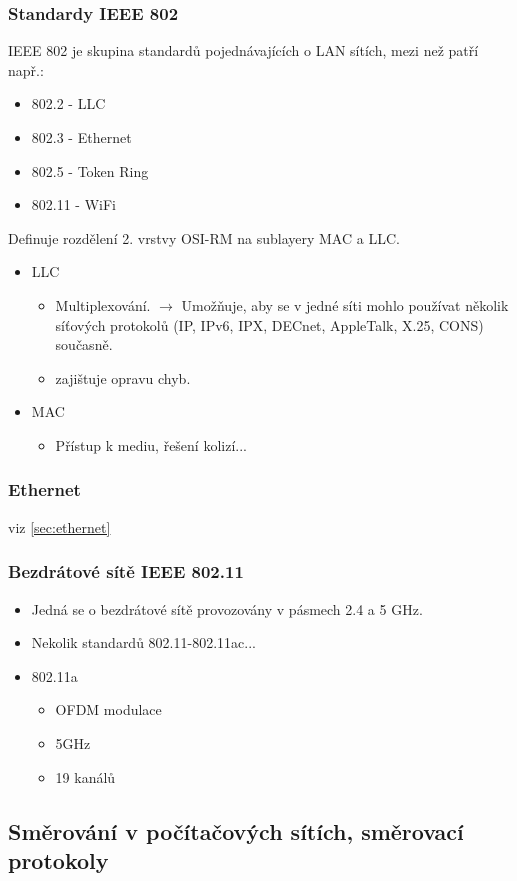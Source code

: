 \documentclass[10pt,a4paper]{article}
\begin{document}
\subsubsection{Standardy IEEE 802}
IEEE 802 je skupina standardů pojednávajících o LAN sítích, mezi než patří např.:
\begin{itemize}
\item 802.2 - LLC
\item 802.3 - Ethernet
\item 802.5 - Token Ring
\item 802.11 - WiFi
\end{itemize}
Definuje rozdělení 2. vrstvy OSI-RM na sublayery MAC a LLC.
\begin{itemize}
\item LLC
\begin{itemize}
\item Multiplexování. $\rightarrow$ Umožňuje, aby se v jedné síti mohlo používat několik síťových protokolů (IP, IPv6, IPX, DECnet, AppleTalk, X.25, CONS) současně.
\item zajištuje opravu chyb.
\end{itemize}
\item MAC
\begin{itemize}
\item Přístup k mediu, řešení kolizí...
\end{itemize}
\end{itemize}
\subsubsection{Ethernet} 
viz \ref{sec:ethernet}
\subsubsection{Bezdrátové sítě IEEE 802.11}
\begin{itemize}
\item Jedná se o bezdrátové sítě provozovány v pásmech 2.4 a 5 GHz.
\item Nekolik standardů 802.11-802.11ac...
\item 802.11a
\begin{itemize}
\item OFDM modulace
\item 5GHz
\item 19 kanálů
\end{itemize}
\end{itemize}
\subsection{Směrování v počítačových sítích, směrovací protokoly}
\end{document}
